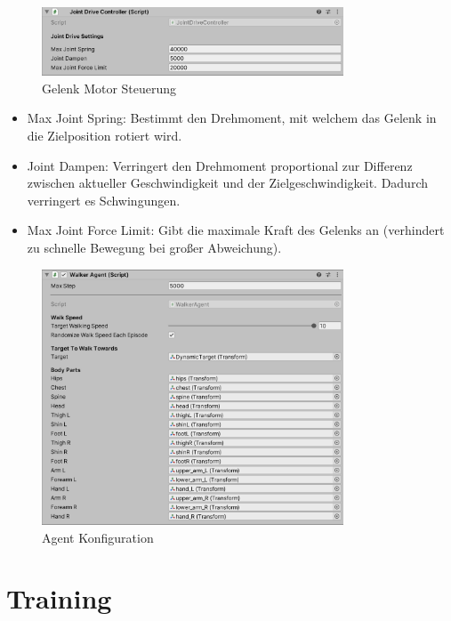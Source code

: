 \begin{figure}[H]
  \centering  
  \includegraphics[width=0.8\textwidth]{img/komponente_joint_drive_controller}
  \caption{Gelenk Motor Steuerung}
  \label{fig:komponente_joint_drive_controller}
\end{figure}

\begin{itemize}
  \item Max Joint Spring: Bestimmt den Drehmoment, mit welchem das Gelenk in die Zielposition rotiert wird.
  \item Joint Dampen: Verringert den Drehmoment proportional zur Differenz zwischen aktueller Geschwindigkeit und der Zielgeschwindigkeit. Dadurch verringert es Schwingungen.
  \item Max Joint Force Limit: Gibt die maximale Kraft des Gelenks an (verhindert zu schnelle Bewegung bei großer Abweichung).
\end{itemize}

\begin{figure}[H]
  \centering  
  \includegraphics[width=0.8\textwidth]{img/komponente_walker_agent}
  \caption{Agent Konfiguration}
  \label{fig:komponente_walker_agent}
\end{figure}

\section{Training}

